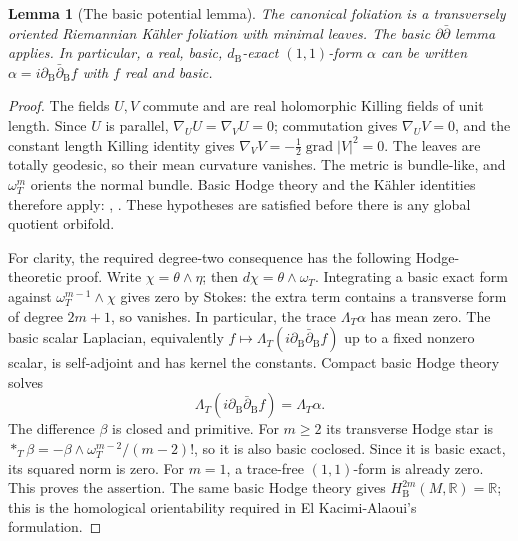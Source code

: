 \documentclass[12pt]{amsart}
\newtheorem{lem}[thm]{Lemma}
\theoremstyle{definition}
\theoremstyle{remark}
\numberwithin{equation}{section}
\newcommand{\R}{\mathbb{R}}
\newcommand{\bas}{\mathrm{B}}
\newcommand{\wt}{\omega_{T}}
\begin{document}
\begin{lem}[The basic potential lemma]\label{lem:ddbar}
The canonical foliation is a transversely oriented Riemannian K\"ahler
foliation with minimal leaves. The basic $\partial\bar\partial$ lemma
applies. In particular, a real, basic, $d_{\bas}$-exact $(1,1)$-form
$\alpha$ can be written $\alpha=i\partial_{\bas}\bar\partial_{\bas}f$
with $f$ real and basic.
\end{lem}
\begin{proof}
The fields $U,V$ commute and are real holomorphic Killing fields of unit
length. Since $U$ is parallel, $\nabla_UU=\nabla_VU=0$; commutation gives
$\nabla_UV=0$, and the constant length Killing identity gives
$\nabla_VV=-\tfrac12\operatorname{grad}|V|^2=0$. The leaves are totally
geodesic, so their mean curvature vanishes. The metric is bundle-like,
and $\wt^m$ orients the normal bundle. Basic Hodge theory and the K\"ahler
identities therefore apply: \cite[Sections 3.3--3.4, Proposition 3.5.1]{EK},
\cite[Section 2.2]{IO}. These hypotheses are satisfied before there is any
global quotient orbifold.

For clarity, the required degree-two consequence has the following
Hodge-theoretic proof. Write $\chi=\theta\wedge\eta$; then
$d\chi=\theta\wedge\wt$. Integrating a basic exact form against
$\wt^{m-1}\wedge\chi$ gives zero by Stokes: the extra term contains
a transverse form of degree $2m+1$, so vanishes. In particular,
the trace $\Lambda_T\alpha$ has mean zero. The basic scalar Laplacian,
equivalently $f\mapsto\Lambda_T(i\partial_{\bas}\bar\partial_{\bas}f)$
up to a fixed nonzero scalar, is self-adjoint and has kernel the constants.
Compact basic Hodge theory solves
\[
\Lambda_T(i\partial_{\bas}\bar\partial_{\bas}f)=\Lambda_T\alpha.
\]
The difference $\beta$ is closed and primitive. For $m\geq2$ its
transverse Hodge star is
$*_T\beta=-\beta\wedge\wt^{m-2}/(m-2)!$, so it is also basic
coclosed. Since it is basic exact, its squared norm is zero. For $m=1$,
a trace-free $(1,1)$-form is already zero. This proves the assertion.
The same basic Hodge theory gives $H_{\bas}^{2m}(M,\R)=\R$; this is
the homological orientability required in El Kacimi-Alaoui's formulation.
\end{proof}
\end{document}
